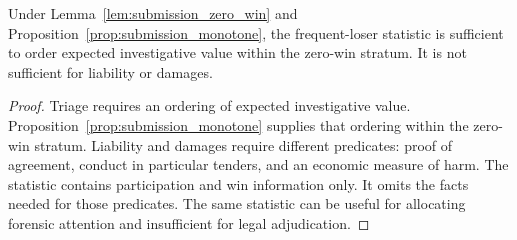 \begin{proposition}
\label{prop:submission_scope}
Under Lemma~\ref{lem:submission_zero_win} and
Proposition~\ref{prop:submission_monotone}, the frequent-loser statistic
is sufficient to order expected investigative value within the
zero-win stratum. It is not sufficient for liability or damages.
\end{proposition}

\begin{proof}
Triage requires an ordering of expected investigative value.
Proposition~\ref{prop:submission_monotone} supplies that ordering
within the zero-win stratum. Liability and damages require
different predicates: proof of agreement, conduct in particular
tenders, and an economic measure of harm. The statistic contains
participation and win information only. It omits the facts needed
for those predicates. The same statistic can be useful for
allocating forensic attention and insufficient for legal
adjudication.
\end{proof}
